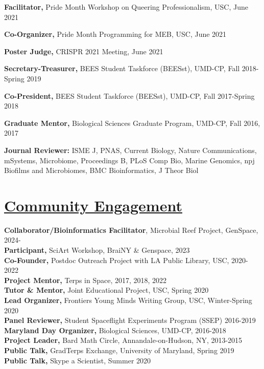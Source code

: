 \documentclass[]{res}
\begin{document}
\begin{resume}
{\bf Facilitator,} {Pride Month Workshop on Queering Professionalism}, USC, June 2021

{\bf Co-Organizer,} {Pride Month Programming for MEB}, USC, June 2021


{\bf Poster Judge,} {CRISPR 2021 Meeting}, June 2021

{\bf Secretary-Treasurer,} {BEES Student Taskforce (BEESst)}, UMD-CP, Fall 2018-Spring 2019 %

{\bf Co-President,} {BEES Student Taskforce (BEESst)}, UMD-CP, Fall 2017-Spring 2018

{\bf Graduate Mentor,} {Biological Sciences Graduate Program}, UMD-CP, Fall 2016, 2017 %

{\bf Journal Reviewer:} ISME J, PNAS, Current Biology, Nature Communications, mSystems, Microbiome, Proceedings B, PLoS Comp Bio, Marine Genomics, npj Biofilms and Microbiomes, BMC Bioinformatics, J Theor Biol

\section{\underline{Community Engagement}}\vspace{2mm}
{\bf Collaborator/Bioinformatics Facilitator}, Microbial Reef Project, GenSpace, 2024-\\
{\bf Participant,} SciArt Workshop, BraiNY \& Genspace, 2023\\
{\bf Co-Founder,} Postdoc Outreach Project with LA Public Library, USC, 2020-2022\\
{\bf Project Mentor,} Terps in Space, 2017, 2018, 2022\\
{\bf Tutor \& Mentor,} Joint Educational Project, USC, Spring 2020\\
{\bf Lead Organizer,} Frontiers Young Minds Writing Group, USC, Winter-Spring 2020\\
{\bf Panel Reviewer,} Student Spaceflight Experiments Program (SSEP) 2016-2019\\
{\bf Maryland Day Organizer,} Biological Sciences, UMD-CP, 2016-2018\\
{\bf Project Leader,} Bard Math Circle, Annandale-on-Hudson, NY, 2013-2015 \\
{\bf Public Talk,} GradTerps Exchange, University of Maryland, Spring 2019\\
{\bf Public Talk,} Skype a Scientist, Summer 2020


\end{resume}
\end{document}
